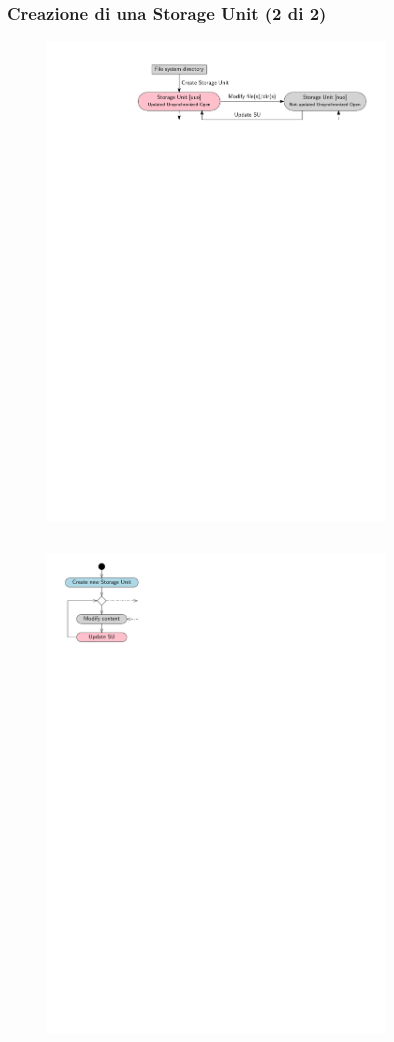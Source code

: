 \documentclass{beamer}
\begin{document}
\begin{frame}[fragile]
	\frametitle{Creazione di una Storage Unit (2 di 2)}
	\begin{figure}
		\includegraphics[width=0.8\textwidth]{figures/uuo.pdf}
	\end{figure}
	\begin{columns}
		\begin{figure}
			\includegraphics[width=0.8\textwidth]{figures/create.pdf}

\end{figure}
\end{columns}
\end{frame}
\end{document}
